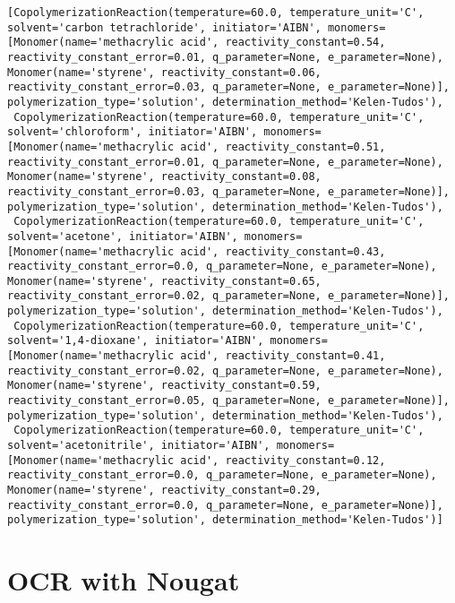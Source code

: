 \documentclass[
  letterpaper,
  DIV=11,
  numbers=noendperiod]{scrreprt}
\begin{document}
\begin{verbatim}
[CopolymerizationReaction(temperature=60.0, temperature_unit='C', solvent='carbon tetrachloride', initiator='AIBN', monomers=[Monomer(name='methacrylic acid', reactivity_constant=0.54, reactivity_constant_error=0.01, q_parameter=None, e_parameter=None), Monomer(name='styrene', reactivity_constant=0.06, reactivity_constant_error=0.03, q_parameter=None, e_parameter=None)], polymerization_type='solution', determination_method='Kelen-Tudos'),
 CopolymerizationReaction(temperature=60.0, temperature_unit='C', solvent='chloroform', initiator='AIBN', monomers=[Monomer(name='methacrylic acid', reactivity_constant=0.51, reactivity_constant_error=0.01, q_parameter=None, e_parameter=None), Monomer(name='styrene', reactivity_constant=0.08, reactivity_constant_error=0.03, q_parameter=None, e_parameter=None)], polymerization_type='solution', determination_method='Kelen-Tudos'),
 CopolymerizationReaction(temperature=60.0, temperature_unit='C', solvent='acetone', initiator='AIBN', monomers=[Monomer(name='methacrylic acid', reactivity_constant=0.43, reactivity_constant_error=0.0, q_parameter=None, e_parameter=None), Monomer(name='styrene', reactivity_constant=0.65, reactivity_constant_error=0.02, q_parameter=None, e_parameter=None)], polymerization_type='solution', determination_method='Kelen-Tudos'),
 CopolymerizationReaction(temperature=60.0, temperature_unit='C', solvent='1,4-dioxane', initiator='AIBN', monomers=[Monomer(name='methacrylic acid', reactivity_constant=0.41, reactivity_constant_error=0.02, q_parameter=None, e_parameter=None), Monomer(name='styrene', reactivity_constant=0.59, reactivity_constant_error=0.05, q_parameter=None, e_parameter=None)], polymerization_type='solution', determination_method='Kelen-Tudos'),
 CopolymerizationReaction(temperature=60.0, temperature_unit='C', solvent='acetonitrile', initiator='AIBN', monomers=[Monomer(name='methacrylic acid', reactivity_constant=0.12, reactivity_constant_error=0.0, q_parameter=None, e_parameter=None), Monomer(name='styrene', reactivity_constant=0.29, reactivity_constant_error=0.0, q_parameter=None, e_parameter=None)], polymerization_type='solution', determination_method='Kelen-Tudos')]
\end{verbatim}


\hypertarget{ocr-with-nougat}{%
\chapter{OCR with Nougat}\label{ocr-with-nougat}}
\end{document}
